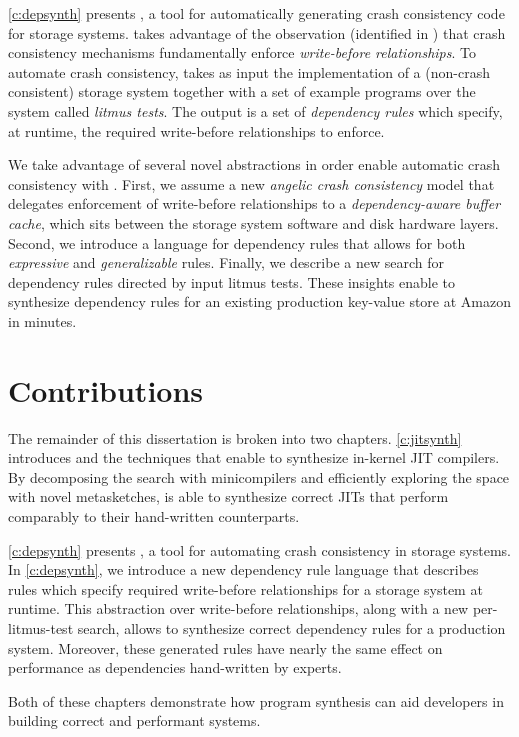 \cref{c:depsynth} presents \depsynth, a tool for automatically generating crash consistency
code for storage systems.
\depsynth takes advantage of the observation
(identified in \cite{frost:featherstitch})
that crash consistency mechanisms fundamentally enforce \textit{write-before relationships}.
To automate crash consistency,
\depsynth takes as input the implementation of a (non-crash consistent) storage system together
with a set of example programs over the system called \textit{litmus tests}.
The output is a set of \textit{dependency rules} which specify, at runtime,
the required write-before relationships to enforce.

We take advantage of several novel abstractions in order enable
automatic crash consistency with \depsynth.
First, we assume a new \textit{angelic crash consistency} model
that delegates enforcement of write-before relationships to a
\textit{dependency-aware buffer cache},
which sits between the storage system software and disk hardware layers.
Second, we introduce a language for dependency rules
that allows for both \textit{expressive} and \textit{generalizable} rules.
Finally, we describe a new search for dependency rules
directed by input litmus tests.
These insights enable \depsynth to synthesize dependency rules for an existing
production key-value store at Amazon \cite{bornholt:s3} in \shardstoresynthesistime minutes.

\section{Contributions}
The remainder of this dissertation is broken into two chapters.
\cref{c:jitsynth} introduces \jitsynth and the techniques that enable
\jitsynth to synthesize in-kernel JIT compilers.
By decomposing the search with minicompilers
and efficiently exploring the space with novel metasketches,
\jitsynth is able to synthesize correct JITs that perform
comparably to their hand-written counterparts.

\cref{c:depsynth} presents \depsynth, a tool for automating
crash consistency in storage systems. In \cref{c:depsynth},
we introduce a new dependency rule language that describes rules
which specify required write-before relationships for a storage system
at runtime. This abstraction over write-before relationships, along
with a new per-litmus-test search, allows \depsynth to synthesize
correct dependency rules for a production system.
Moreover, these generated rules have nearly the same effect on performance
as dependencies hand-written by experts.

Both of these chapters demonstrate
how program synthesis can aid developers in building
correct and performant systems.

